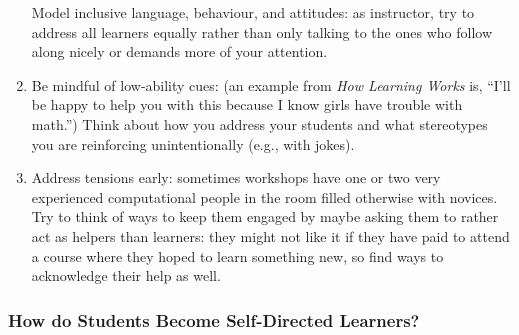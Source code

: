 \begin{enumerate}
  Model inclusive language, behaviour, and attitudes: as instructor, try
  to address all learners equally rather than only talking to the ones
  who follow along nicely or demands more of your attention.
\item
  Be mindful of low-ability cues: (an example from \emph{How Learning
  Works} is, ``I'll be happy to help you with this because I know girls
  have trouble with math.'') Think about how you address your students
  and what stereotypes you are reinforcing unintentionally (e.g., with
  jokes).
\item
  Address tensions early: sometimes workshops have one or two very
  experienced computational people in the room filled otherwise with
  novices. Try to think of ways to keep them engaged by maybe asking
  them to rather act as helpers than learners: they might not like it if
  they have paid to attend a course where they hoped to learn something
  new, so find ways to acknowledge their help as well.
\end{enumerate}

\subsubsection{How do Students Become Self-Directed
Learners?}\label{how-do-students-become-self-directed-learners}

